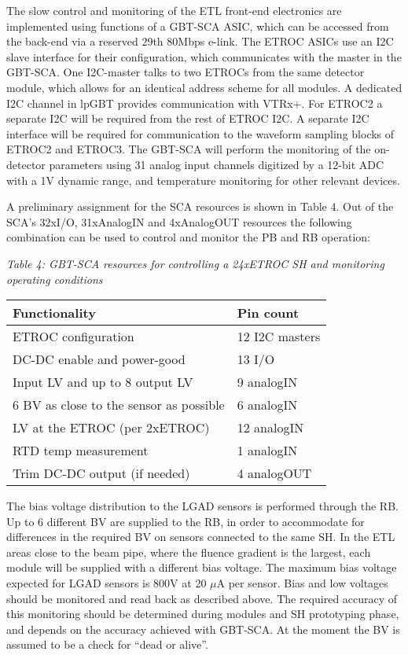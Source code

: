 \documentclass[11pt]{article}
\begin{document}
The slow control and monitoring of the ETL front-end electronics are implemented using functions of a GBT-SCA ASIC, which can be accessed from the back-end via a reserved 29th 80Mbps e-link. The ETROC ASICs use an I2C slave interface for their configuration, which communicates with the master in the GBT-SCA. One I2C-master talks to two ETROCs from the same detector module, which allows for an identical address scheme for all modules. A dedicated I2C channel in lpGBT provides communication with VTRx+. For ETROC2 a separate I2C will be required from the rest of ETROC I2C. A separate I2C interface will be required for communication to the waveform sampling blocks of ETROC2 and ETROC3. The GBT-SCA will perform the monitoring of the on-detector parameters using 31 analog input channels digitized by a 12-bit ADC with a 1V dynamic range, and temperature monitoring for other relevant devices.

A preliminary assignment for the SCA resources is shown in Table 4. Out of the SCA's 32xI/O, 31xAnalogIN and 4xAnalogOUT resources the following combination can be used to control and monitor the PB and RB operation:

\emph{Table 4: GBT-SCA resources for controlling a 24xETROC SH and monitoring operating conditions}

\begin{longtable}[]{@{}ll@{}}
\textbf{Functionality} & \textbf{Pin count}\\
\midrule
\endhead
ETROC configuration                     & 12 I2C masters\\
DC-DC enable and power-good             & 13 I/O\\
Input LV and up to 8 output LV          & 9 analogIN\\
6 BV as close to the sensor as possible & 6 analogIN\\
LV at the ETROC (per 2xETROC)           & 12 analogIN\\
RTD temp measurement                    & 1 analogIN\\
Trim DC-DC output (if needed)           & 4 analogOUT\\
\end{longtable}

The bias voltage distribution to the LGAD sensors is performed through the RB. Up to 6 different BV are supplied to the RB, in order to accommodate for differences in the required BV on sensors connected to the same SH. In the ETL areas close to the beam pipe, where the fluence gradient is the largest, each module will be supplied with a different bias voltage. The maximum bias voltage expected for LGAD sensors is 800V at 20 $\mu$A per sensor. Bias and low voltages should be monitored and read back as described above. The required accuracy of this monitoring should be determined during modules and SH prototyping phase, and depends on the accuracy achieved with GBT-SCA. At the moment the BV is assumed to be a check for ``dead or alive''.
\end{document}
